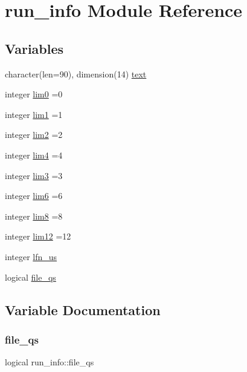 \hypertarget{namespacerun__info}{}\section{run\+\_\+info Module Reference}
\label{namespacerun__info}
\subsection*{Variables}
\begin{DoxyCompactItemize}
\item 
character(len=90), dimension(14) \hyperlink{namespacerun__info_a7ebcc0191b287ed4b8f80e6080cc1dc8}{text}
\item 
integer \hyperlink{namespacerun__info_a4406caf0abae1b67ad05c7ed0c7904c0}{lim0} =0
\item 
integer \hyperlink{namespacerun__info_adc3a55251266df823d3449b67005bade}{lim1} =1
\item 
integer \hyperlink{namespacerun__info_af89da03470d913f288c8deaa72c81e98}{lim2} =2
\item 
integer \hyperlink{namespacerun__info_a776a112d5d931e6d58195aac621d98c8}{lim4} =4
\item 
integer \hyperlink{namespacerun__info_ad7a71d5b6da02d9fe343cf50247e63f1}{lim3} =3
\item 
integer \hyperlink{namespacerun__info_a30737240d73cc13facaa16e6234df127}{lim6} =6
\item 
integer \hyperlink{namespacerun__info_a541da993ba7c0323fde4a512605bbe8f}{lim8} =8
\item 
integer \hyperlink{namespacerun__info_a635c9fcab621a64612a513a423762d84}{lim12} =12
\item 
integer \hyperlink{namespacerun__info_ab21dc24ae87c9094754723447a6c94e5}{lfn\+\_\+us}
\item 
logical \hyperlink{namespacerun__info_a0ccca59a580a8242d13b9e96cc6d1d4d}{file\+\_\+qs}
\end{DoxyCompactItemize}


\subsection{Variable Documentation}
\mbox{\label{namespacerun__info_a0ccca59a580a8242d13b9e96cc6d1d4d}} 
\subsubsection{\texorpdfstring{file\+\_\+qs}{file\_qs}}
{\footnotesize\ttfamily logical run\+\_\+info\+::file\+\_\+qs}




